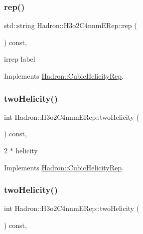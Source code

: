 \subsubsection{\texorpdfstring{rep()}{rep()}\hspace{0.1cm}{\footnotesize\ttfamily [2/2]}}
{\footnotesize\ttfamily std\+::string Hadron\+::\+H3o2\+C4nnm\+E\+Rep\+::rep (\begin{DoxyParamCaption}{ }\end{DoxyParamCaption}) const\hspace{0.3cm}{\ttfamily [inline]}, {\ttfamily [virtual]}}

irrep label 

Implements \mbox{\hyperlink{structHadron_1_1CubicHelicityRep_a8cdd86f068a167dc96faef02bfb8a33d}{Hadron\+::\+Cubic\+Helicity\+Rep}}.

\mbox{\label{structHadron_1_1H3o2C4nnmERep_a35fd1930d21f1fdc0c007b9d9f95b211}} 
\subsubsection{\texorpdfstring{twoHelicity()}{twoHelicity()}\hspace{0.1cm}{\footnotesize\ttfamily [1/2]}}
{\footnotesize\ttfamily int Hadron\+::\+H3o2\+C4nnm\+E\+Rep\+::two\+Helicity (\begin{DoxyParamCaption}{ }\end{DoxyParamCaption}) const\hspace{0.3cm}{\ttfamily [inline]}, {\ttfamily [virtual]}}

2 $\ast$ helicity 

Implements \mbox{\hyperlink{structHadron_1_1CubicHelicityRep_af507aa56fc2747eacc8cb6c96db31ecc}{Hadron\+::\+Cubic\+Helicity\+Rep}}.

\mbox{\label{structHadron_1_1H3o2C4nnmERep_a35fd1930d21f1fdc0c007b9d9f95b211}} 
\subsubsection{\texorpdfstring{twoHelicity()}{twoHelicity()}\hspace{0.1cm}{\footnotesize\ttfamily [2/2]}}
{\footnotesize\ttfamily int Hadron\+::\+H3o2\+C4nnm\+E\+Rep\+::two\+Helicity (\begin{DoxyParamCaption}{ }\end{DoxyParamCaption}) const\hspace{0.3cm}{\ttfamily [inline]}, {\ttfamily [virtual]}}


